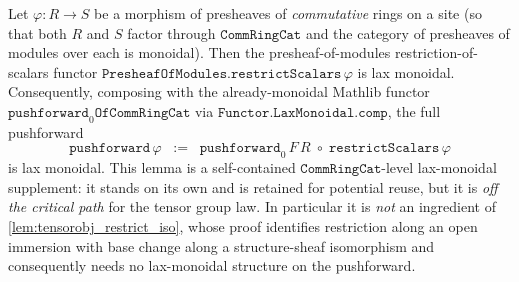 \begin{lemma}

  \label{lem:restrictscalars_laxmonoidal}
  Let \(\varphi : R \to S\) be a morphism of presheaves of \emph{commutative}
  rings on a site (so that both \(R\) and \(S\) factor through
  \(\mathtt{CommRingCat}\) and the category of presheaves of modules over each
  is monoidal). Then the presheaf-of-modules restriction-of-scalars functor
  \(\mathtt{PresheafOfModules.restrictScalars}\,\varphi\) is lax monoidal.
  Consequently, composing with the already-monoidal Mathlib functor
  \(\mathtt{pushforward}_0\mathtt{OfCommRingCat}\) via
  \(\mathtt{Functor.LaxMonoidal.comp}\), the full pushforward
  \[
    \mathtt{pushforward}\,\varphi
      \;\;:=\;\;
    \mathtt{pushforward}_0\,F\,R \;\circ\; \mathtt{restrictScalars}\,\varphi
  \]
  is lax monoidal. This lemma is a self-contained
  \(\mathtt{CommRingCat}\)-level lax-monoidal supplement: it stands on its own
  and is retained for potential reuse, but it is \emph{off the critical path}
  for the tensor group law. In particular it is \emph{not} an ingredient of
  \cref{lem:tensorobj_restrict_iso}, whose proof identifies restriction along an
  open immersion with base change along a structure-sheaf isomorphism and
  consequently needs no lax-monoidal structure on the pushforward.
\end{lemma}

